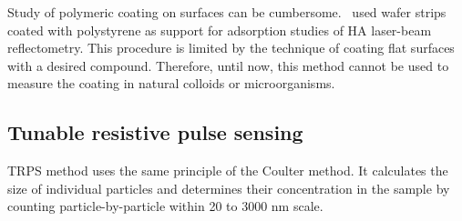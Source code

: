 \documentclass[journal=langd5,manuscript=article]{achemso}
\begin{document}
Study of polymeric coating   on surfaces can be cumbersome.~\citeauthor{doi:10.1021/es981236u}\cite{doi:10.1021/es981236u}
used   wafer strips coated with  polystyrene as support for
adsorption studies of HA laser-beam reflectometry. This procedure is
limited by the technique of coating flat surfaces with a desired compound. Therefore, until now, this method cannot be used to measure the coating in natural colloids or microorganisms.







\subsection{Tunable resistive pulse sensing}
TRPS method uses the same principle of the Coulter method. It calculates the size of individual particles and determines their  concentration in the sample by counting particle-by-particle within 20 to 3000 nm scale.
\end{document}
